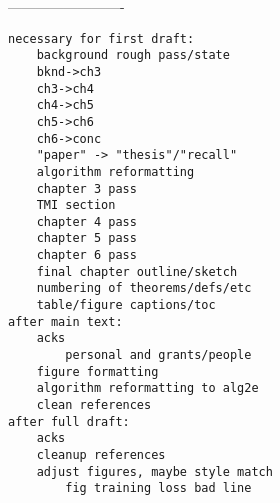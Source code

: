 -------------------------

\begin{verbatim}
necessary for first draft:
	background rough pass/state
	bknd->ch3
	ch3->ch4
	ch4->ch5
	ch5->ch6
	ch6->conc
	"paper" -> "thesis"/"recall"
	algorithm reformatting
	chapter 3 pass
	TMI section
	chapter 4 pass
	chapter 5 pass
	chapter 6 pass
	final chapter outline/sketch
    numbering of theorems/defs/etc
	table/figure captions/toc
after main text:
    acks
    	personal and grants/people
    figure formatting
    algorithm reformatting to alg2e
    clean references
after full draft:
	acks
	cleanup references
	adjust figures, maybe style match
		fig training loss bad line
\end{verbatim}

